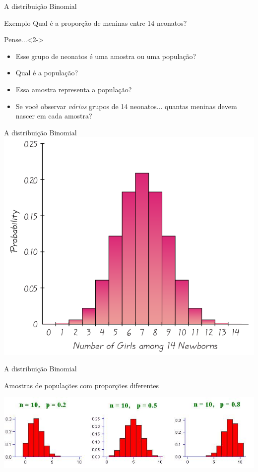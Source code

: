 \documentclass{beamer}
\begin{document}
\begin{frame}{\scriptsize A distribuição Binomial}
  \begin{exampleblock}{Exemplo}
    \footnotesize
    Qual é a proporção de meninas entre 14 neonatos?
  \end{exampleblock}
  \begin{block}{Pense...}<2->
    \begin{itemize}
    \footnotesize
    \item Esse grupo de neonatos é uma amostra ou uma população?
    \item<3-> Qual é a população?
    \item<4-> Essa amostra \alert{representa} a população?
      \bigskip
    \item<5-> Se você observar {\em vários} grupos de 14 neonatos... quantas meninas devem nascer em cada amostra?
    \end{itemize}
  \end{block}

\end{frame}

\begin{frame}{\scriptsize A distribuição Binomial}
  \includegraphics[height=\textheight]{Cap2/discreta}
\end{frame}


\begin{frame}{\scriptsize A distribuição Binomial}
  \begin{block}{}
    \footnotesize
    Amostras de populações com proporções diferentes
  \end{block}

  \includegraphics[width=\textwidth]{Cap2/binomial}
\end{frame}
\end{document}
